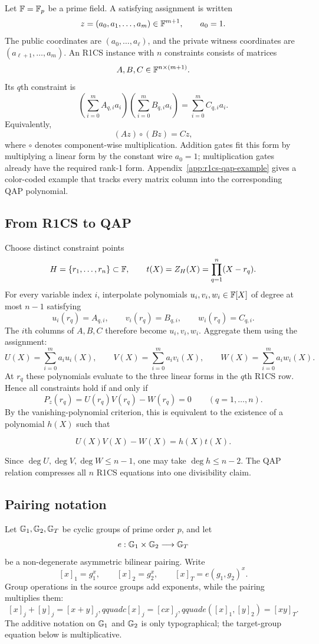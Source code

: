 Let $\mathbb{F}=\mathbb{F}_p$ be a prime field. A satisfying assignment is written
\[
z=(a_0,a_1,\ldots,a_m)\in\mathbb{F}^{m+1},
\qquad a_0=1.
\]
The public coordinates are $(a_0,\ldots,a_\ell)$, and the private witness coordinates are $(a_{\ell+1},\ldots,a_m)$. An R1CS instance with $n$ constraints consists of matrices
\[
A,B,C\in\mathbb{F}^{n\times(m+1)}.
\]
Its $q$th constraint is
\[
\left(\sum_{i=0}^{m}A_{q,i}a_i\right)
\left(\sum_{i=0}^{m}B_{q,i}a_i\right)
=
\sum_{i=0}^{m}C_{q,i}a_i.
\]
Equivalently,
\[
(Az)\circ(Bz)=Cz,
\]
where $\circ$ denotes component-wise multiplication. Addition gates fit this form by multiplying a linear form by the constant wire $a_0=1$; multiplication gates already have the required rank-1 form. Appendix~\ref{app:r1cs-qap-example} gives a color-coded example that tracks every matrix column into the corresponding QAP polynomial.

\subsection{From R1CS to QAP}

Choose distinct constraint points
\[
H=\{r_1,\ldots,r_n\}\subset\mathbb{F},
\qquad
t(X)=Z_H(X)=\prod_{q=1}^{n}(X-r_q).
\]
For every variable index $i$, interpolate polynomials $u_i,v_i,w_i\in\mathbb{F}[X]$ of degree at most $n-1$ satisfying
\[
u_i(r_q)=A_{q,i},\qquad
v_i(r_q)=B_{q,i},\qquad
w_i(r_q)=C_{q,i}.
\]
The $i$th columns of $A,B,C$ therefore become $u_i,v_i,w_i$. Aggregate them using the assignment:
\[
U(X)=\sum_{i=0}^{m}a_i u_i(X),\qquad
V(X)=\sum_{i=0}^{m}a_i v_i(X),\qquad
W(X)=\sum_{i=0}^{m}a_i w_i(X).
\]
At $r_q$ these polynomials evaluate to the three linear forms in the $q$th R1CS row. Hence all constraints hold if and only if
\[
P_z(r_q)=U(r_q)V(r_q)-W(r_q)=0
\qquad(q=1,\ldots,n).
\]
By the vanishing-polynomial criterion, this is equivalent to the existence of a polynomial $h(X)$ such that
\begin{tcolorbox}
\[
U(X)V(X)-W(X)=h(X)t(X).
\]
\end{tcolorbox}
Since $\deg U,\deg V,\deg W\le n-1$, one may take $\deg h\le n-2$. The QAP relation compresses all $n$ R1CS equations into one divisibility claim.

\subsection{Pairing notation}

Let $\mathbb{G}_1,\mathbb{G}_2,\mathbb{G}_T$ be cyclic groups of prime order $p$, and let
\[
e:\mathbb{G}_1\times\mathbb{G}_2\longrightarrow\mathbb{G}_T
\]
be a non-degenerate asymmetric bilinear pairing. Write
\[
[x]_1=g_1^x,\qquad [x]_2=g_2^x,
\qquad [x]_T=e(g_1,g_2)^x.
\]
Group operations in the source groups add exponents, while the pairing multiplies them:
\[
[x]_j+[y]_j=[x+y]_j,qquad
c[x]_j=[cx]_j,qquad
e([x]_1,[y]_2)=[xy]_T.
\]
The additive notation on $\mathbb{G}_1$ and $\mathbb{G}_2$ is only typographical; the target-group equation below is multiplicative.

